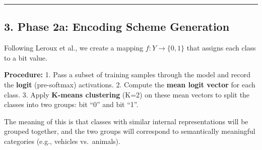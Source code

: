 \documentclass[11pt]{article}
\begin{document}
    \begin{center}\rule{0.5\linewidth}{0.5pt}\end{center}

\subsection{3. Phase 2a: Encoding Scheme
Generation}\label{phase-2a-encoding-scheme-generation}

Following Leroux et al., we create a mapping
\(f: Y \rightarrow \{0, 1\}\) that assigns each class to a bit value.

\textbf{Procedure:} 1. Pass a subset of training samples through the
model and record the \textbf{logit} (pre-softmax) activations. 2.
Compute the \textbf{mean logit vector} for each class. 3. Apply
\textbf{K-means clustering} (K=2) on these mean vectors to split the
classes into two groups: bit ``0'' and bit ``1''.

The meaning of this is that classes with similar internal
representations will be grouped together, and the two groups will
correspond to semantically meaningful categories (e.g., vehicles
vs.~animals).
\end{document}
